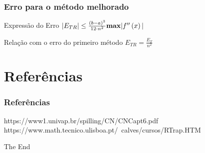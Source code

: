 \documentclass{beamer}
\begin{document}
\begin{frame}
\frametitle{Erro para o método melhorado}
\begin{block}{Expressão do Erro}
$\vert E_{TR}\vert \le \frac{\left(b-a\right)^3}{12\cdot n^2} \textrm{\textbf{max}} \vert f''\left(x\right) \vert$
\end{block}

\begin{block}{Relação com o erro do primeiro método}
$E_{TR} = \frac{E_T}{n^2}$
\end{block}
\end{frame}



\section{Referências}
\begin{frame}
\frametitle{Referências}
\footnotesize{
\begin{thebibliography}{99} %
https://www1.univap.br/spilling/CN/CNCapt6.pdf
https://www.math.tecnico.ulisboa.pt/~calves/cursos/RTrap.HTM
\end{thebibliography}
}
\end{frame}


\begin{frame}
\Huge{\centerline{The End}}
\end{frame}

\end{document}
